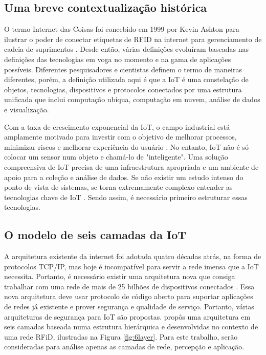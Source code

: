\documentclass[tcc,capa]{texufpel}
\begin{document}
\subsection{Uma breve contextualização histórica}

O termo Internet das Coisas foi concebido em 1999 por Kevin Ashton para ilustrar o poder de conectar etiquetas de RFID na internet para gerenciamento de cadeia de suprimentos \cite{ashton}. Desde então, várias definições evoluíram baseadas nas definições das tecnologias em voga no momento e na gama de aplicações possíveis. Diferentes pesquisadores e cientistas definem o termo de maneiras diferentes, porém, a definição utilizada aqui é que a IoT é uma constelação de objetos, tecnologias, dispositivos e protocolos conectados por uma estrutura unificada que inclui computação ubíqua, computação em nuvem, análise de dados e visualização.

Com a taxa de crescimento exponencial da IoT, o campo industrial está amplamente motivado para investir com o objetivo de melhorar processos, minimizar riscos e melhorar experiência do usuário \cite{Sharma2019}. No entanto, IoT não é só colocar um sensor num objeto e chamá-lo de "inteligente". Uma solução compreensiva de IoT precisa de uma infraestrutura apropriada e um ambiente de apoio para a coleção e análise de dados. Se não existir um estudo intenso do ponto de vista de sistemas, se torna extremamente complexo entender as tecnologias chave de IoT \cite{xu}. Sendo assim, é necessário primeiro estruturar essas tecnologias.

\subsection{O modelo de seis camadas da IoT}

A arquitetura existente da internet foi adotada quatro décadas atrás, na forma de protocolos TCP/IP, mas hoje é incompatível para servir a rede imensa que a IoT necessita. Portanto, é necessário existir uma arquitetura nova que consiga trabalhar com uma rede de mais de 25 bilhões de dispositivos conectados \cite{Sharma2019}. Essa nova arquitetura deve usar protocolo de código aberto para suportar aplicações de redes já existente e prover segurança e qualidade de serviço. Portanto, várias arquiteturas de segurança para IoT são propostas. \citet{xu} propôs uma arquitetura em seis camadas baseada numa estrutura hierárquica e desenvolvidas no contexto de uma rede RFiD, ilustradas na Figura \ref{fig:6layer}. Para este trabalho, serão consideradas para análise apenas as camadas de rede, percepção e aplicação. 
\end{document}
